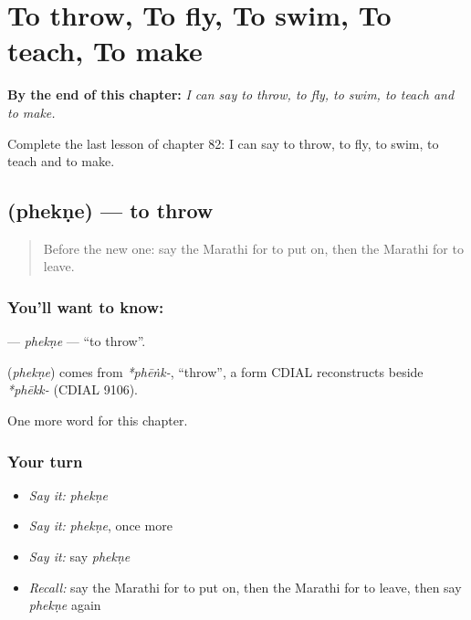 
\chapter{To throw, To fly, To swim, To teach, To make}
\label{ch:mr-to-throw-to-fly-to-swim-to-teach-to-make}

\begin{chapteropening}
\textbf{By the end of this chapter:} \emph{I can say to throw, to fly, to swim, to teach and to make.}

Complete the last lesson of chapter 82: I can say to throw, to fly, to swim, to teach and to make.
\end{chapteropening}

\section[\texorpdfstring{\mr{फेकणे} (phekṇe)}{फेकणे (phekṇe)}]{ (phekṇe) — to throw}

\label{lesson:MR-C82-phekne}



\begin{quote}
Before the new one: say the Marathi for to put on, then the Marathi for to leave.
\end{quote}

\subsection*{You'll want to know: }
\textbf{} — \emph{phekṇe} — \textquotedblleft{}to throw\textquotedblright{}.

\begin{cousinweb}
\textbf{} (\emph{phekṇe}) comes from \emph{*phēṅk-}, \textquotedblleft{}throw\textquotedblright{}, a form CDIAL reconstructs beside \emph{*phēkk-} (CDIAL 9106).
\end{cousinweb}

\begin{grammarlens}[title={What you've built}]
One more word for this chapter.
\end{grammarlens}

\subsection*{Your turn}
\begin{itemize}
\raggedright
  \item \emph{Say it:} \emph{phekṇe}
  \item \emph{Say it:} \emph{phekṇe}, once more
  \item \emph{Say it:} say \emph{phekṇe}
  \item \emph{Recall:} say the Marathi for to put on, then the Marathi for to leave, then say \emph{phekṇe} again
\end{itemize}

